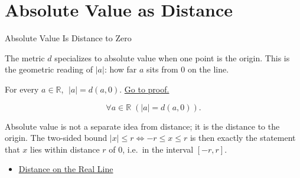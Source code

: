 \section{Absolute Value as Distance}
\label{sec:absolute-value-as-distance}

\begin{topicbox}{Absolute Value Is Distance to Zero}
\begin{exposition}
The metric $d$ specializes to absolute value when one point is the origin. This is the geometric reading of $|a|$: how far $a$ sits from $0$ on the line.
\end{exposition}
\end{topicbox}
\begin{tcolorbox}[colback=propbox, colframe=propborder, arc=2pt,
  left=6pt, right=6pt, top=4pt, bottom=4pt,
  title={\small\textbf{Proposition (Absolute Value Is Distance to the Origin)}},
  fonttitle=\small\bfseries]
\begin{proposition}
\label{prop:abs-value-is-distance-to-zero}
For every $a\in\mathbb{R}$, $\;|a|=d(a,0)$.
\hyperref[prf:abs-value-is-distance-to-zero]{Go to proof.}
\end{proposition}
\end{tcolorbox}
\begin{remark*}
\[
\forall a\in\mathbb{R}\;(|a|=d(a,0)).
\]
\end{remark*}
\begin{remark*}[Interpretation]
Absolute value is not a separate idea from distance; it is the distance to the origin. The two-sided bound $|x|\le r \Leftrightarrow -r\le x\le r$ is then exactly the statement that $x$ lies within distance $r$ of $0$, i.e.\ in the interval $[-r,r]$.
\end{remark*}
\begin{dependencies}
\begin{itemize}
  \item \hyperref[def:distance-on-real-line]{Distance on the Real Line}
\end{itemize}
\end{dependencies}
